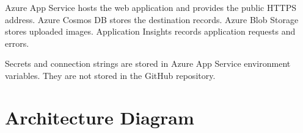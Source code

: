 \documentclass[12pt,a4paper]{article}
\begin{document}
Azure App Service hosts the web application and provides the public HTTPS address. Azure Cosmos DB stores the destination records. Azure Blob Storage stores uploaded images. Application Insights records application requests and errors.

Secrets and connection strings are stored in Azure App Service environment variables. They are not stored in the GitHub repository.




\section{Architecture Diagram}
\end{document}

